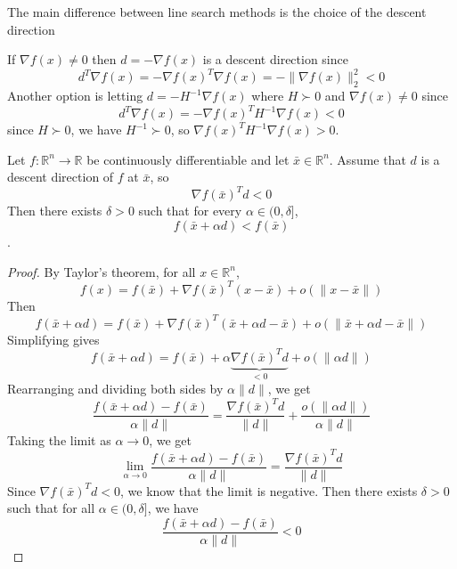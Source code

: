 The main difference between line search methods is the choice of the descent direction
\begin{problem}[Example]
  If $\nabla f(x) \neq 0$ then $d = - \nabla f(x)$ is a descent direction since
  $$d^T \nabla f(x) = -\nabla f(x)^T \nabla f(x) = - \|\nabla f(x) \|^2_2 < 0$$
  Another option is letting $d = -H^{-1} \nabla f(x)$ where $H \succ 0$ and $\nabla f(x) \neq 0$ since
  $$d^T \nabla f(x) = - \nabla f(x)^T H^{-1} \nabla f(x) < 0$$
  since $H \succ 0$, we have $H^{-1} \succ 0$, so $\nabla f(x)^T H^{-1} \nabla f(x) > 0$.
\end{problem}
\begin{theorem}
  Let $f: \mathbb R^n \to \mathbb R$ be continuously differentiable and let $\bar x \in \mathbb R^n$. Assume that $d$ is a descent direction of $f$ at $\bar x$, so $$\nabla f(\bar x)^T d < 0$$ Then there exists $\delta > 0$ such that for every $\alpha \in (0, \delta]$, 
  $$f(\bar x + \alpha d) < f(\bar x)$$.
\end{theorem}
\begin{proof}[Proof]
  By Taylor's theorem, for all $x \in \mathbb R^n$, 
  $$f(x) = f(\bar x) + \nabla f(\bar x)^T (x - \bar x) + o(\|x - \bar x\|)$$
  Then
  $$f(\bar x + \alpha d) = f(\bar x) + \nabla f(\bar x)^T (\bar x + \alpha d - \bar x) + o(\|\bar x + \alpha d - \bar x\|)$$
  Simplifying gives
  $$f(\bar x + \alpha d) = f(\bar x) + \alpha \underbrace{\nabla f(\bar x)^T d}_{< 0} + o(\|\alpha d\|)$$ Rearranging and dividing both sides by $\alpha \|d\|$, we get
  $$\frac{f(\bar x + \alpha d) - f(\bar x)}{\alpha \|d\|} = \frac{\nabla f(\bar x)^T d}{\|d\|} + \frac{o(\|\alpha d\|)}{\alpha \|d\|}$$
  Taking the limit as $\alpha \to 0$, we get
  $$\lim_{\alpha \to 0} \frac{f(\bar x + \alpha d) - f(\bar x)}{\alpha \|d\|} = \frac{\nabla f(\bar x)^T d}{\|d\|}$$
  Since $\nabla f(\bar x)^T d < 0$, we know that the limit is negative. Then there exists $\delta > 0$ such that for all $\alpha \in (0, \delta]$, we have
  $$\frac{f(\bar x + \alpha d) - f(\bar x)}{\alpha \|d\|} < 0$$
\end{proof}

